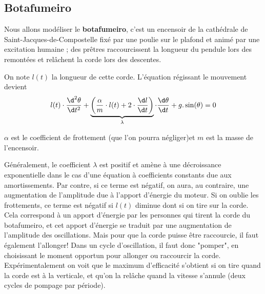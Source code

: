 \subsection{Botafumeiro}
\begin{minipage}[c]{.60\linewidth}
Nous allons modéliser le {\bf botafumeiro}, c'est un encensoir de la cathédrale de Saint-Jacques-de-Compostelle fixé par une poulie sur le plafond et animé par une excitation  humaine ;  des prêtres raccourcissent la longueur du pendule lors des remontées et relâchent la corde lors des descentes.
\end{minipage}  
\begin{minipage}[c]{.40\linewidth}
\begin{center}
\end{center}
\end{minipage}  
On note $l(t)$ la longueur de cette corde. L'équation régissant le mouvement devient
\[
l(t)\cdot\frac{\d^2 \theta}{\d t^2} + 
\underbrace{\left(\frac{\alpha}m\cdot l(t) + 2 \cdot\frac{\d l}{\d t}\right)}_{\lambda}
\cdot\frac{\d \theta}{\d t} + g.\sin(\theta) = 0
\]

$\alpha$ est le coefficient de frottement (que l'on pourra négliger)et $m$ est la masse de l'encensoir.

Généralement, le coefficient $\lambda$ est positif et amène à une décroissance exponentielle dans le cas d’une équation à coefficients constants due aux amortissements. Par contre, si ce terme est négatif, on aura, au contraire, une augmentation de l’amplitude due à l’apport d’énergie du moteur. Si on oublie les frottements, ce terme est négatif si $l(t)$ diminue dont si on tire sur la corde. Cela correspond à un apport d’énergie par les personnes qui tirent la corde du botafumeiro, et cet apport d’énergie se traduit par une augmentation de l’amplitude des oscillations. Mais pour que la corde puisse être raccourcie, il faut également l’allonger! Dans un cycle d’oscillation, il faut donc "pomper", en choisissant le moment opportun pour allonger ou raccourcir la corde. Expérimentalement on voit que le maximum d’efficacité s’obtient si on tire quand la corde est à la verticale, et qu’on la relâche quand la vitesse s’annule (deux cycles de pompage par période).

